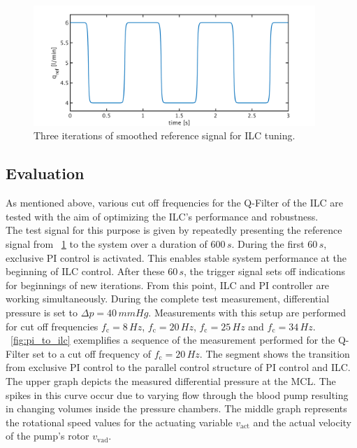 \begin{figure}[ht]
  \centering
  \includegraphics[width=0.95\textwidth]{images/chapt_5/ILC/ref_signal_ILC3.pdf}
  \caption[Smoothed reference signal for ILC tuning]{Three iterations of smoothed reference signal for ILC tuning.}
  \label{fig:ref_signal_ILC3}
\end{figure}
\subsection{Evaluation}
As mentioned above, various cut off frequencies for the Q-Filter of the ILC are tested with the aim of optimizing the ILC's performance and robustness.  \\The test signal for this purpose is given by repeatedly presenting the reference signal from \figurename~\ref{fig:ref_signal_ILC3} to the system over a duration of $600\,s$. During the first $60\,s$, exclusive PI control is activated. This enables stable system performance at the beginning of ILC control. After these $60\,s$, the trigger signal sets off indications for beginnings of new iterations. From this point, ILC and PI controller are working simultaneously. During the complete test measurement, differential pressure is set to $\Delta{p}=40\,mmHg$. Measurements with this setup are performed for cut off frequencies $f_{\mathrm{c}}=8\,Hz$, $f_{\mathrm{c}}=20\,Hz$, $f_{\mathrm{c}}=25\,Hz$ and $f_{\mathrm{c}}=34\,Hz$.
\\\figurename~\ref{fig:pi_to_ilc} exemplifies a sequence of the measurement performed for the Q-Filter set to a cut off frequency of $f_{\mathrm{c}}=20\,Hz$. The segment shows the transition from exclusive PI control to the parallel control structure of PI control and ILC. The upper graph depicts the measured differential pressure at the MCL. The spikes in this curve occur due to varying flow through the blood pump resulting in changing volumes inside the pressure chambers. The middle graph represents the rotational speed values for the actuating variable $v_{\mathrm{act}}$ and the actual velocity of the pump's rotor $v_{\mathrm{vad}}$.

